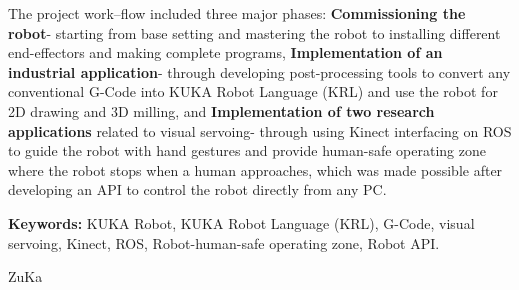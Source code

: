 The project work--flow included three major phases: \textbf{Commissioning the robot}- starting from base setting and mastering the robot to installing different end-effectors and making complete programs,  \textbf{Implementation of an industrial application}- through developing post-processing tools to convert any conventional G-Code into KUKA Robot Language (KRL) and use the robot for 2D drawing and 3D milling, and \textbf{ Implementation of two research applications} related to visual servoing- through using Kinect interfacing on ROS to guide the robot with hand gestures and provide human-safe operating zone where the robot stops when a human approaches, which was made possible after developing an API to control the robot directly from any PC.

\vspace{2cm}
\noindent\textbf{Keywords:} KUKA Robot, KUKA Robot Language (KRL), G-Code, visual servoing, Kinect, ROS, Robot-human-safe operating zone, Robot API.
 
 ZuKa